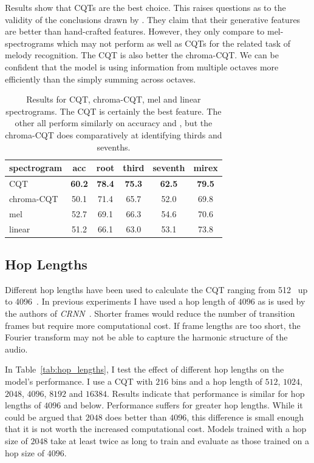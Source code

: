 Results show that CQTs are the best choice. This raises questions as to the validity of the conclusions drawn by \citet{MelodyTranscriptionViaGenerativePreTraining}. They claim that their generative features are better than hand-crafted features. However, they only compare to mel-spectrograms which may not perform as well as CQTs for the related task of melody recognition. The CQT is also better the chroma-CQT. We can be confident that the model is using information from multiple octaves more efficiently than the simply summing across octaves.

\begin{table}[h]
    \centering
    \begin{tabular}{lccccc}
        \toprule
        spectrogram & acc & root & third & seventh & mirex \\  
        \midrule
        CQT & \textbf{60.2} & \textbf{78.4} & \textbf{75.3} & \textbf{62.5} & \textbf{79.5} \\
        chroma-CQT & 50.1 & 71.4 & 65.7 & 52.0 & 69.8 \\
        mel & 52.7 & 69.1 & 66.3 & 54.6 & 70.6 \\
        linear & 51.2 & 66.1 & 63.0 & 53.1 & 73.8 \\
        \bottomrule
    \end{tabular}
    \caption{Results for CQT, chroma-CQT, mel and linear spectrograms. The CQT is certainly the best feature. The other all perform similarly on accuracy and , but the chroma-CQT does comparatively at identifying thirds and sevenths. }\label{tab:spectrograms}
\end{table}

\subsection{Hop Lengths}\label{sec:hop-lengths}

Different hop lengths have been used to calculate the CQT ranging from 512~\cite{ACRLargeVocab1} up to 4096~\citep{StructuredTraining}. In previous experiments I have used a hop length of $4096$ as is used by the authors of \emph{CRNN}~\citep{StructuredTraining}. Shorter frames would reduce the number of transition frames but require more computational cost. If frame lengths are too short, the Fourier transform may not be able to capture the harmonic structure of the audio.

In Table~\ref{tab:hop_lengths}, I test the effect of different hop lengths on the model's performance. I use a CQT with $216$ bins and a hop length of $512$, $1024$, $2048$, $4096$, $8192$ and $16384$. Results indicate that performance is similar for hop lengths of $4096$ and below. Performance suffers for greater hop lengths. While it could be argued that $2048$ does better than $4096$, this difference is small enough that it is not worth the increased computational cost. Models trained with a hop size of $2048$ take at least twice as long to train and evaluate as those trained on a hop size of $4096$.

